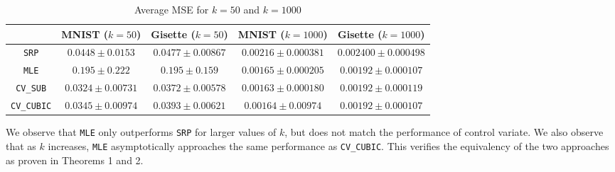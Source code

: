 \documentclass[runningheads]{llncs}
\begin{document}
\begin{center}
    \begin{table}[h]
        \small
        \centering
        \caption{Average MSE for $k = 50$ and $k=1000$}
        \label{table:small_k}
        \begin{adjustbox}{width=\columnwidth,center}
        \begin{tabular}{|c|c|c|c|c|}
        \hline & \textbf{MNIST} ($k=50$) & \textbf{Gisette} ($k=50$) & \textbf{MNIST} ($k=1000$) & \textbf{Gisette} ($k=1000$)  \\ \hline
        \verb|SRP|       & $0.0448 \pm 0.0153$ & $0.0477 \pm 0.00867$ & $0.00216 \pm 0.000381$ & $0.002400 \pm 0.000498$ \\ \hline
        \verb|MLE|       & $0.195 \pm 0.222$ & $0.195 \pm 0.159$ & $0.00165 \pm 0.000205$ & $0.00192 \pm 0.000107$ \\ \hline 
        \verb|CV_SUB|    & $\mathbf{0.0324 \pm 0.00731}$ & $\mathbf{0.0372 \pm 0.00578}$ & $\mathbf{0.00163 \pm 0.000180}$ & $\mathbf{0.00192 \pm 0.000119}$ \\ \hline
        \verb|CV_CUBIC|  & $0.0345 \pm 0.00974$ & $0.0393 \pm 0.00621$  & $0.00164 \pm 0.00974$ & $0.00192 \pm 0.000107$ \\ \hline
        \end{tabular}
        \end{adjustbox}
    \end{table}
\end{center}    
    We observe that \verb|MLE| only outperforms \verb|SRP| for larger values of $k$, but does not match the performance of control variate. We also observe that as $k$ increases, \verb|MLE| asymptotically approaches the same performance as \verb|CV_CUBIC|. This verifies the equivalency of the two approaches as proven in Theorems 1 and 2.    
\end{document}
